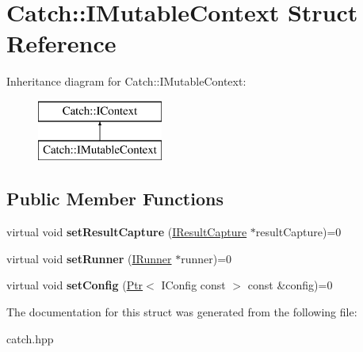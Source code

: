 \hypertarget{structCatch_1_1IMutableContext}{}\section{Catch\+:\+:I\+Mutable\+Context Struct Reference}
\label{structCatch_1_1IMutableContext}
Inheritance diagram for Catch\+:\+:I\+Mutable\+Context\+:\begin{figure}[H]
\begin{center}
\leavevmode
\includegraphics[height=2.000000cm]{structCatch_1_1IMutableContext}
\end{center}
\end{figure}
\subsection*{Public Member Functions}
\begin{DoxyCompactItemize}
\item 
virtual void {\bfseries set\+Result\+Capture} (\hyperlink{structCatch_1_1IResultCapture}{I\+Result\+Capture} $\ast$result\+Capture)=0\hypertarget{structCatch_1_1IMutableContext_a4a80afd0525b7def21bee8d9b48f2d39}{}\label{structCatch_1_1IMutableContext_a4a80afd0525b7def21bee8d9b48f2d39}

\item 
virtual void {\bfseries set\+Runner} (\hyperlink{structCatch_1_1IRunner}{I\+Runner} $\ast$runner)=0\hypertarget{structCatch_1_1IMutableContext_af2e53b1dea4527a2587cff266a730f6e}{}\label{structCatch_1_1IMutableContext_af2e53b1dea4527a2587cff266a730f6e}

\item 
virtual void {\bfseries set\+Config} (\hyperlink{classCatch_1_1Ptr}{Ptr}$<$ I\+Config const  $>$ const \&config)=0\hypertarget{structCatch_1_1IMutableContext_a04ae4f4219a481a7bf658d9fd445bc1d}{}\label{structCatch_1_1IMutableContext_a04ae4f4219a481a7bf658d9fd445bc1d}

\end{DoxyCompactItemize}


The documentation for this struct was generated from the following file\+:\begin{DoxyCompactItemize}
\item 
catch.\+hpp\end{DoxyCompactItemize}
